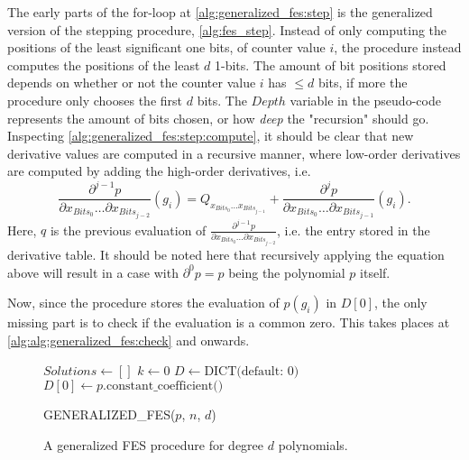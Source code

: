 The early parts of the for-loop at \cref{alg:generalized_fes:step} is the generalized version of the stepping procedure, \cref{alg:fes_step}. Instead of only computing the positions of the least significant one bits, of counter value $i$, the procedure instead computes the positions of the least $d$ 1-bits. The amount of bit positions stored depends on whether or not the counter value $i$ has $\leq d$ bits, if more the procedure only chooses the first $d$ bits. The $Depth$ variable in the pseudo-code represents the amount of bits chosen, or how \textit{deep} the "recursion" should go. Inspecting \cref{alg:generalized_fes:step:compute}, it should be clear that new derivative values are computed in a recursive manner, where low-order derivatives are computed by adding the high-order derivatives, i.e.
\begin{equation} \label{eq:fes_recurse}
    \frac{\partial^{j - 1} p}{\partial x_{Bits_0} \dots \partial x_{Bits_{j - 2}}}(g_i) = Q_{x_{Bits_0} \dots x_{Bits_{j - 1}}} + \frac{\partial^j p}{\partial x_{Bits_0} \dots \partial x_{Bits_{j - 1}}}(g_i).
\end{equation}
Here, $q$ is the previous evaluation of $\frac{\partial^{j - 1} p}{\partial x_{Bits_0} \dots \partial x_{Bits_{j - 2}}}$, i.e. the entry stored in the derivative table. It should be noted here that recursively applying the equation above will result in a case with $\partial^0 p = p$ being the polynomial $p$ itself.


Now, since the procedure stores the evaluation of $p(g_i)$ in $D[0]$, the only missing part is to check if the evaluation is a common zero. This takes places at \cref{alg:alg:generalized_fes:check} and onwards.

\begin{figure}[ht]
    \begin{alg}
        $Solutions \gets []$\;
        $k \gets 0$\;
        $D \gets \text{DICT(default: 0)}$\;
        $D[0] \gets p.\text{constant\_coefficient()}$\;
        \caption{GENERALIZED\_FES($p$, $n$, $d$)} \label{alg:generalized_fes}
    \end{alg}
    \caption{A generalized FES procedure for degree $d$ polynomials.}
\end{figure}

